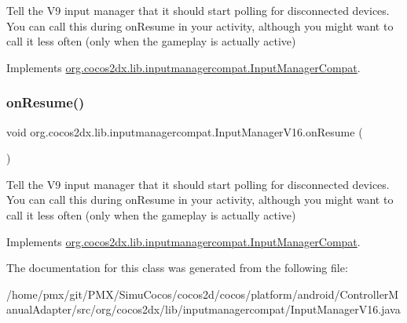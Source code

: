 Tell the V9 input manager that it should start polling for disconnected devices. You can call this during on\+Resume in your activity, although you might want to call it less often (only when the gameplay is actually active) 

Implements \hyperlink{interfaceorg_1_1cocos2dx_1_1lib_1_1inputmanagercompat_1_1InputManagerCompat_a8ce6170ffd23cf2a18374c271939ac1e}{org.\+cocos2dx.\+lib.\+inputmanagercompat.\+Input\+Manager\+Compat}.

\mbox{\label{classorg_1_1cocos2dx_1_1lib_1_1inputmanagercompat_1_1InputManagerV16_a06cacfc2a899e281361bfd190d35bcec}} 
\subsubsection{\texorpdfstring{on\+Resume()}{onResume()}\hspace{0.1cm}{\footnotesize\ttfamily [2/2]}}
{\footnotesize\ttfamily void org.\+cocos2dx.\+lib.\+inputmanagercompat.\+Input\+Manager\+V16.\+on\+Resume (\begin{DoxyParamCaption}{ }\end{DoxyParamCaption})\hspace{0.3cm}{\ttfamily [inline]}}

Tell the V9 input manager that it should start polling for disconnected devices. You can call this during on\+Resume in your activity, although you might want to call it less often (only when the gameplay is actually active) 

Implements \hyperlink{interfaceorg_1_1cocos2dx_1_1lib_1_1inputmanagercompat_1_1InputManagerCompat_a8ce6170ffd23cf2a18374c271939ac1e}{org.\+cocos2dx.\+lib.\+inputmanagercompat.\+Input\+Manager\+Compat}.



The documentation for this class was generated from the following file\+:\begin{DoxyCompactItemize}
\item 
/home/pmx/git/\+P\+M\+X/\+Simu\+Cocos/cocos2d/cocos/platform/android/\+Controller\+Manual\+Adapter/src/org/cocos2dx/lib/inputmanagercompat/Input\+Manager\+V16.\+java\end{DoxyCompactItemize}
